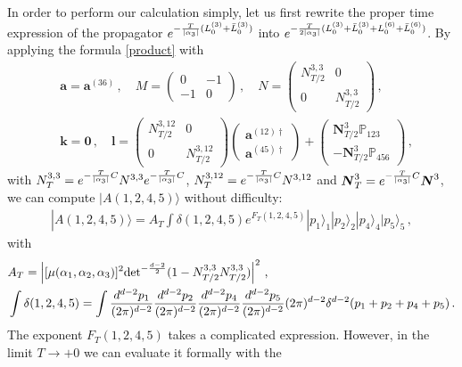 \documentclass[12pt]{article}
\begin{document}
In order to perform our calculation simply, let us first rewrite the
proper time expression of the propagator
$e^{-{T\over |\alpha_3|}(L_0^{(3)}+\bar{L}_0^{(3)})}$
into $e^{-{T\over 2|\alpha_3|}
(L_0^{(3)}+\bar{L}_0^{(3)}+L_0^{(6)}+\bar{L}_0^{(6)})}$.
By applying the formula \eqref{product} with
\begin{align}
&\boldsymbol{a}=\boldsymbol{a}^{(36)}\,,\quad
M=\begin{pmatrix}0&-1\\-1&0\end{pmatrix}\,,\quad
N=\begin{pmatrix}N^{3,3}_{T/2}&0\\0&N^{3,3}_{T/2}\end{pmatrix}\,,
\nonumber\\
&\boldsymbol{k}=\boldsymbol{0}\,,\quad
\boldsymbol{l}=\begin{pmatrix}N^{3,12}_{T/2}&0\\
0&N^{3,12}_{T/2}\end{pmatrix}
\begin{pmatrix}\boldsymbol{a}^{(12)\dagger}\\
\boldsymbol{a}^{(45)\dagger}\end{pmatrix}
+\begin{pmatrix}\boldsymbol{N}^{3}_{T/2}{\mathbb P}_{123}\\
-\boldsymbol{N}^{3}_{T/2}{\mathbb P}_{456}\end{pmatrix}\,,
\end{align}
with $N^{3,3}_{T}=e^{-{T\over |\alpha_3|}C}N^{3,3}
e^{-{T\over |\alpha_3|}C}$,
$N^{3,12}_{T}=e^{-{T\over |\alpha_3|}C}N^{3,12}$ and
$\boldsymbol{N}^3_{T}
=e^{-{T\over |\alpha_3|}C}\boldsymbol{N}^3$, we can compute
$|A(1,2,4,5)\rangle$ without difficulty:
\begin{align}
|A(1,2,4,5)\rangle
=A_T\int\delta(1,2,4,5)
e^{F_T(1,2,4,5)}|p_1\rangle_1|p_2\rangle_2|p_4\rangle_4|p_5\rangle_5\,,
\label{eq:tree_T}
\end{align}
with
\begin{align}
&A_T=\left|[\mu(\alpha_1,\alpha_2,\alpha_3)]^2{\det}^{-{d-2\over 2}}
(1-N^{3,3}_{T/2}N^{3,3}_{T/2})\right|^2\,,\\
&\int\delta(1,2,4,5)=\int
{d^{d-2}p_1\over (2\pi)^{d-2}}
{d^{d-2}p_2\over (2\pi)^{d-2}}
{d^{d-2}p_4\over (2\pi)^{d-2}}
{d^{d-2}p_5\over (2\pi)^{d-2}}
(2\pi)^{d-2}\delta^{d-2}(p_1+p_2+p_4+p_5)\,.
\end{align}
The exponent $F_T(1,2,4,5)$ takes a complicated expression.
However, in the limit $T\to +0$ we can evaluate it formally with the
\end{document}
